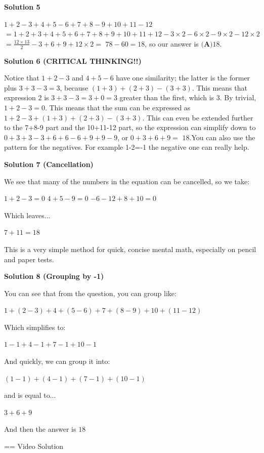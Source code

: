 \begin{enumerate}
\textbf{Solution 5}

$1+2-3+4+5-6+7+8-9+10+11-12$ $=1+2+3+4+5+6+7+8+9+10+11+12-3\times2-6\times2-9\times2-12\times2$ $=\frac{12\times13}2-{3+6+9+12}\times2=$ $78-60=18$, so our answer is $\boxed{\textbf{(A)}18}$.

 



\textbf{Solution 6 (CRITICAL THINKING!!)}

Notice that $1+2-3$ and $4+5-6$ have one similarity; the latter is the former plus $3+3-3 = 3$, because $(1+3)+(2+3)-(3+3)$. This means that expression 2 is $3+3-3=3+0=3$ greater than the first, which is $3$. By trivial, $1+2-3=0.$ This means that the sum can be expressed as $1+2-3+(1+3)+(2+3)-(3+3)$. This can even be extended further to the 7+8-9 part and the 10+11-12 part, so the expression can simplify down to $0+3+3-3+6+6-6+9+9-9$, or $0+3+6+9=$ $\boxed{\text{18}}$.You can also use the pattern for the negatives. For example 1-2=-1 the negative one can really help.

 



\textbf{Solution 7 (Cancellation)}

We see that many of the numbers in the equation can be cancelled, so we take:

 $1+2-3 = 0$
$4+5-9 = 0$
$-6-12+8+10 = 0$

 Which leaves...

 $7+11 = \boxed{\text{18}}$

 This is a very simple method for quick, concise mental math, especially on pencil and paper tests.

 



\textbf{Solution 8 (Grouping by -1)}

You can see that from the question, you can group like: 

 $1+(2-3)+4+(5-6)+7+(8-9)+10+(11-12)$

 Which simplifies to:

 $1-1+4-1+7-1+10-1$

 And quickly, we can group it into:

 $(1-1)+(4-1)+(7-1)+(10-1)$

 and is equal to...

 $3+6+9$

 And then the answer is $\boxed{\text{18}}$

 == Video Solution 

 



\end{enumerate}
